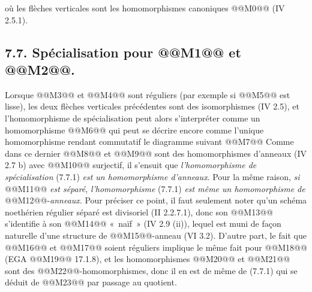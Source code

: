 
où les
flèches verticales sont les homomorphismes canoniques @@M0@@ (IV 2.5.1).

\subsection*{7.7. Spécialisation pour @@M1@@ et @@M2@@.}
Lorsque @@M3@@ et @@M4@@ sont réguliers (par exemple si @@M5@@ est lisse), les deux flèches verticales précédentes sont des isomorphismes (IV 2.5), et l'homomorphisme de spécialisation peut alors s'interpréter comme un homomorphisme
@@M6@@
qui peut se décrire encore comme l'unique homomorphisme rendant commutatif le diagramme suivant
@@M7@@
Comme dans ce dernier @@M8@@ et @@M9@@ sont des homomorphismes d'anneaux (IV 2.7 b) avec @@M10@@ surjectif, il s'ensuit que \emph{l'homomorphisme de spécialisation} (7.7.1) \emph{est un homomorphisme d'anneaux}. Pour la même raison, \emph{si} @@M11@@ \emph{est séparé}, \emph{l'homomorphisme} (7.7.1) \emph{est même un homomorphisme de} @@M12@@-\emph{anneaux}. Pour préciser ce point, il faut seulement noter qu'un schéma noethérien régulier séparé est divisoriel (II 2.2.7.1), donc son @@M13@@ s'identifie à son @@M14@@ «~naïf~» (IV 2.9 (ii)), lequel est muni de façon naturelle d'une structure de @@M15@@-anneau (VI 3.2). D'autre part, le fait que @@M16@@ et @@M17@@ soient réguliers implique le même fait pour @@M18@@ (EGA @@M19@@ 17.1.8), et les homomorphismes @@M20@@ et @@M21@@ sont des @@M22@@-homomorphismes, donc il en est de même de (7.7.1) qui se déduit de @@M23@@ par passage au quotient.

